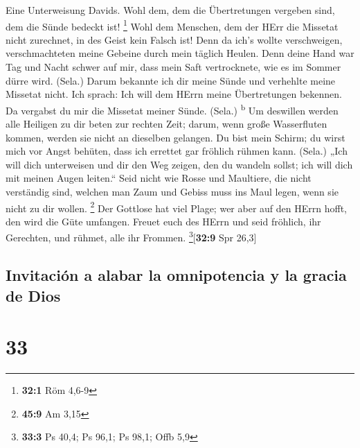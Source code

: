  Eine Unterweisung Davids. Wohl dem, dem die Übertretungen
vergeben sind, dem die Sünde bedeckt ist! \footnote{\textbf{32:1} Röm
  4,6-9}  Wohl dem Menschen, dem der HErr die Missetat
nicht zurechnet, in des Geist kein Falsch ist!  Denn da
ich's wollte verschweigen, verschmachteten meine Gebeine durch mein
täglich Heulen.  Denn deine Hand war Tag und Nacht schwer
auf mir, dass mein Saft vertrocknete, wie es im Sommer dürre wird.
(Sela.)  Darum bekannte ich dir meine Sünde und verhehlte
meine Missetat nicht. Ich sprach: Ich will dem HErrn meine Übertretungen
bekennen. Da vergabst du mir die Missetat meiner Sünde. (Sela.)
\textsuperscript{b}  Um deswillen werden alle Heiligen zu
dir beten zur rechten Zeit; darum, wenn große Wasserfluten kommen,
werden sie nicht an dieselben gelangen.  Du bist mein
Schirm; du wirst mich vor Angst behüten, dass ich errettet gar fröhlich
rühmen kann. (Sela.)  „Ich will dich unterweisen und dir
den Weg zeigen, den du wandeln sollst; ich will dich mit meinen Augen
leiten.``  Seid nicht wie Rosse und Maultiere, die nicht
verständig sind, welchen man Zaum und Gebiss muss ins Maul legen, wenn
sie nicht zu dir wollen. \footnote{\textbf{45:9} Am 3,15}
 Der Gottlose hat viel Plage; wer aber auf den HErrn
hofft, den wird die Güte umfangen.  Freuet euch des HErrn
und seid fröhlich, ihr Gerechten, und rühmet, alle ihr Frommen.
\footnote{\textbf{33:3} Ps 40,4; Ps 96,1; Ps 98,1; Offb 5,9}{[}\textbf{32:9}
Spr 26,3{]}

\hypertarget{invitaciuxf3n-a-alabar-la-omnipotencia-y-la-gracia-de-dios}{%
\subsection{Invitación a alabar la omnipotencia y la gracia de
Dios}\label{invitaciuxf3n-a-alabar-la-omnipotencia-y-la-gracia-de-dios}}

\hypertarget{section-32}{%
\section{33}\label{section-32}}

